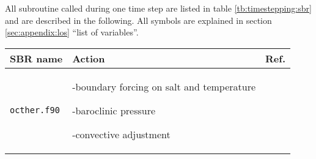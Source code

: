 All subroutine called during one time step are listed in table \ref{tb:timestepping:sbr}
and are described in the following.
All symbols are explained in section \ref{sec:appendix:los} ``list of variables''.


\begin{table}[ht]
\begin{footnotesize}
        \begin{tabular}[t]{l|p{8cm}|l}
        \hline
          SBR name &
          Action &
          Ref. \\
        \hline\hline
         \texttt{octher.f90} &	   
           -boundary forcing on salt and temperature
	   
           -baroclinic pressure
	   
           -convective adjustment
	   

\end{tabular}
\end{footnotesize}
\end{table}
